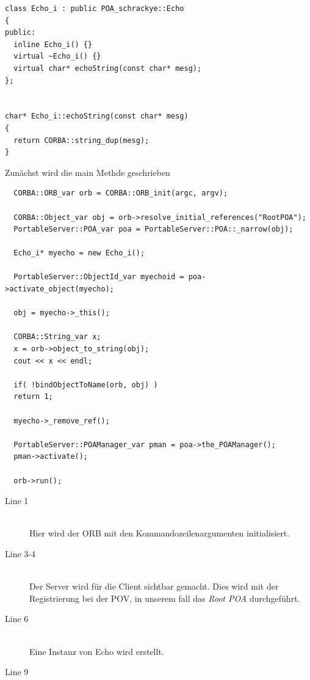 \documentclass[11pt]{article}
\begin{document}
\begin{lstlisting}
class Echo_i : public POA_schrackye::Echo
{
public:
  inline Echo_i() {}
  virtual ~Echo_i() {}
  virtual char* echoString(const char* mesg);
};


char* Echo_i::echoString(const char* mesg)
{
  return CORBA::string_dup(mesg);
}
\end{lstlisting}



Zunächst wird die main Methde geschrieben

\begin{lstlisting}
  CORBA::ORB_var orb = CORBA::ORB_init(argc, argv);

  CORBA::Object_var obj = orb->resolve_initial_references("RootPOA");
  PortableServer::POA_var poa = PortableServer::POA::_narrow(obj);

  Echo_i* myecho = new Echo_i();

  PortableServer::ObjectId_var myechoid = poa->activate_object(myecho);

  obj = myecho->_this();

  CORBA::String_var x;
  x = orb->object_to_string(obj);
  cout << x << endl;

  if( !bindObjectToName(orb, obj) )
  return 1;

  myecho->_remove_ref();

  PortableServer::POAManager_var pman = poa->the_POAManager();
  pman->activate();

  orb->run();
\end{lstlisting}

\begin{description}

\item[Line 1] \hfill \\
Hier wird der ORB mit den Kommandozeilenargumenten initialisiert.

\item[Line 3-4] \hfill \\
Der Server wird für die Client sichtbar gemacht. Dies wird mit der Registrierung bei der POV, in unserem fall das \textit{Root POA} durchgeführt.

\item[Line 6] \hfill \\
Eine Instanz von Echo wird erstellt.

\item[Line 9] \hfill \\
\end{description}
\end{document}

